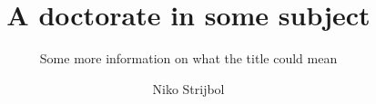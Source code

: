 \documentclass[
    paper=240mm:170mm,
    paper=portrait,
    parskip=half,
    cleardoublepage=plain,
    toc=chapterentrywithdots
]{scrbook}
\author{Niko Strijbol}
\title{A doctorate in some subject}
\subtitle{Some more information on what the title could mean}
\begin{document}
\frontmatter

{
    \selectfont\panno
    \maketitle
}



\tableofcontents





\mainmatter




%    
%    
\end{document}
